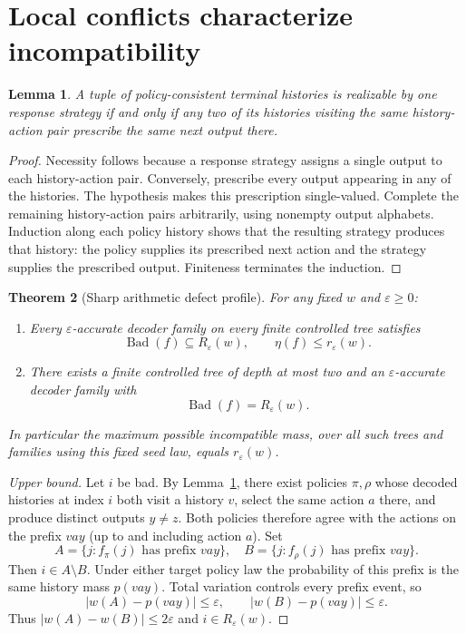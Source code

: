 \documentclass[11pt]{article}
\newtheorem{theorem}{Theorem}
\newtheorem{lemma}[theorem]{Lemma}
\begin{document}
\section{Local conflicts characterize incompatibility}
\begin{lemma}\label{lem:local}
A tuple of policy-consistent terminal histories is realizable by one response strategy if and only if any two of its histories visiting the same history-action pair prescribe the same next output there.
\end{lemma}
\begin{proof}
Necessity follows because a response strategy assigns a single output to each history-action pair. Conversely, prescribe every output appearing in any of the histories. The hypothesis makes this prescription single-valued. Complete the remaining history-action pairs arbitrarily, using nonempty output alphabets. Induction along each policy history shows that the resulting strategy produces that history: the policy supplies its prescribed next action and the strategy supplies the prescribed output. Finiteness terminates the induction.
\end{proof}

\begin{theorem}[Sharp arithmetic defect profile]\label{thm:profile}
For any fixed $w$ and $\varepsilon\ge0$:
\begin{enumerate}
\item Every $\varepsilon$-accurate decoder family on every finite controlled tree satisfies
\[
 \operatorname{Bad}(f)\subseteq R_\varepsilon(w),\qquad
 \eta(f)\le r_\varepsilon(w).
\]
\item There exists a finite controlled tree of depth at most two and an $\varepsilon$-accurate decoder family with
\[
 \operatorname{Bad}(f)=R_\varepsilon(w).
\]
\end{enumerate}
In particular the maximum possible incompatible mass, over all such trees and families using this fixed seed law, equals $r_\varepsilon(w)$.
\end{theorem}
\begin{proof}[Upper bound]
Let $i$ be bad. By Lemma~\ref{lem:local}, there exist policies $\pi,\rho$ whose decoded histories at index $i$ both visit a history $v$, select the same action $a$ there, and produce distinct outputs $y\ne z$. Both policies therefore agree with the actions on the prefix $vay$ (up to and including action $a$). Set
\[
 A=\{j:f_\pi(j)\text{ has prefix }vay\},\quad
 B=\{j:f_\rho(j)\text{ has prefix }vay\}.
\]
Then $i\in A\setminus B$. Under either target policy law the probability of this prefix is the same history mass $p(vay)$. Total variation controls every prefix event, so
\[
 |w(A)-p(vay)|\le\varepsilon,\qquad
 |w(B)-p(vay)|\le\varepsilon.
\]
Thus $|w(A)-w(B)|\le2\varepsilon$ and $i\in R_\varepsilon(w)$.
\end{proof}
\end{document}
